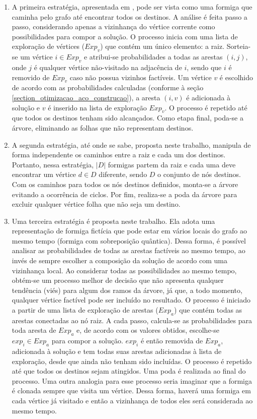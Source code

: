 \begin{enumerate}
	\item A primeira estratégia, apresentada em \cite{Pinto2005}, pode ser vista como uma formiga que caminha pelo grafo até encontrar todos os destinos. A análise é feita passo a passo, considerando apenas a vizinhança do vértice corrente como possibilidades para compor a solução. O processo inicia com uma lista de exploração de vértices ($Exp_v$) que contém um único elemento: a raiz. Sorteia-se um vértice $i \in Exp_v$ e atribui-se probabilidades a todas as arestas $(i, j)$, onde $j$ é qualquer vértice não-visitado na adjacência de $i$, sendo que $i$ é removido de $Exp_v$ caso não possua vizinhos factíveis. Um vértice $v$ é escolhido de acordo com as probabilidades calculadas (conforme à seção \ref{section_otimizacao_aco_construcao}), a aresta $(i, v)$ é adicionada à solução e $v$ é inserido na lista de exploração $Exp_v$. O processo é repetido até que todos os destinos tenham sido alcançados. Como etapa final, poda-se a árvore, eliminando as folhas que não representam destinos.
	\item A segunda estratégia, até onde se sabe, proposta neste trabalho, manipula de forma independente os caminhos entre a raiz e cada um dos destinos. Portanto, nessa estratégia, $|D|$ formigas partem da raiz e cada uma deve encontrar um vértice $d \in D$ diferente, sendo $D$ o conjunto de nós destinos. Com os caminhos para todos os nós destinos definidos, monta-se a árvore evitando a ocorrência de ciclos. Por fim, realiza-se a poda da árvore para excluir qualquer vértice folha que não seja um destino. %
	\item Uma terceira estratégia é proposta neste trabalho. Ela adota uma representação de formiga fictícia que pode estar em vários locais do grafo ao mesmo tempo (formiga com sobreposição quântica). Dessa forma, é possível analisar as probabilidades de todas as arestas factíveis ao mesmo tempo, ao invés de sempre escolher a composição da solução de acordo com uma vizinhança local. Ao considerar todas as possibilidades ao mesmo tempo, obtém-se um processo melhor de decisão que não apresenta qualquer tendência (viés) para algum dos ramos da árvore, já que, a todo momento, qualquer vértice factível pode ser incluído no resultado. O processo é iniciado a partir de uma lista de exploração de arestas ($Exp_a$) que contém todas as arestas conectadas ao nó raiz. A cada passo, calcula-se as probabilidades para toda aresta de $Exp_a$ e, de acordo com os valores obtidos, escolhe-se $exp_i \in Exp_a$ para compor a solução. $exp_i$ é então removida de $Exp_a$, adicionada à solução e tem todas suas arestas adicionadas à lista de exploração, desde que ainda não tenham sido incluídas. O processo é repetido até que todos os destinos sejam atingidos. Uma poda é realizada ao final do processo. Uma outra analogia para esse processo seria imaginar que a formiga é clonada sempre que visita um vértice. Dessa forma, haverá uma formiga em cada vértice já visitado e então a vizinhança de todos eles será considerada ao mesmo tempo.

\end{enumerate}
